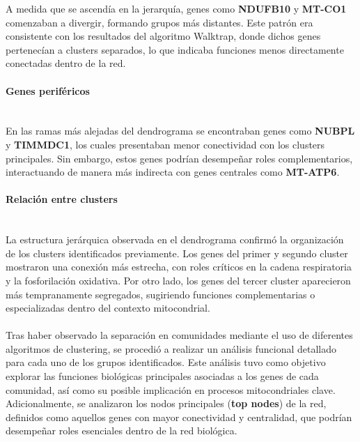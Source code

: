 A medida que se ascendía en la jerarquía, genes como \textbf{NDUFB10} y \textbf{MT-CO1} comenzaban a divergir, formando grupos más distantes. Este patrón era consistente con los resultados del algoritmo Walktrap, donde dichos genes pertenecían a clusters separados, lo que indicaba funciones menos directamente conectadas dentro de la red.

\paragraph{Genes periféricos} \mbox{}\\

En las ramas más alejadas del dendrograma se encontraban genes como \textbf{NUBPL} y \textbf{TIMMDC1}, los cuales presentaban menor conectividad con los clusters principales. Sin embargo, estos genes podrían desempeñar roles complementarios, interactuando de manera más indirecta con genes centrales como \textbf{MT-ATP6}.

\paragraph{Relación entre clusters} \mbox{}\\

La estructura jerárquica observada en el dendrograma confirmó la organización de los clusters identificados previamente. Los genes del primer y segundo cluster mostraron una conexión más estrecha, con roles críticos en la cadena respiratoria y la fosforilación oxidativa. Por otro lado, los genes del tercer cluster aparecieron más tempranamente segregados, sugiriendo funciones complementarias o especializadas dentro del contexto mitocondrial.

\paragraph{}

Tras haber observado la separación en comunidades mediante el uso de diferentes algoritmos de clustering, se procedió a realizar un análisis funcional detallado para cada uno de los grupos identificados. Este análisis tuvo como objetivo explorar las funciones biológicas principales asociadas a los genes de cada comunidad, así como su posible implicación en procesos mitocondriales clave. Adicionalmente, se analizaron los nodos principales (\textbf{top nodes}) de la red, definidos como aquellos genes con mayor conectividad y centralidad, que podrían desempeñar roles esenciales dentro de la red biológica.

